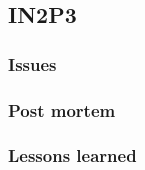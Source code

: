 
\subsection{IN2P3}
\label{sec:site:in2p3}

\subsubsection{Issues}
\label{sec:site:in2p3:Issues}

\subsubsection{Post mortem}
\label{sec:site:in2p3:postmortem}

\subsubsection{Lessons learned}
\label{sec:site:in2p3:lessons}
